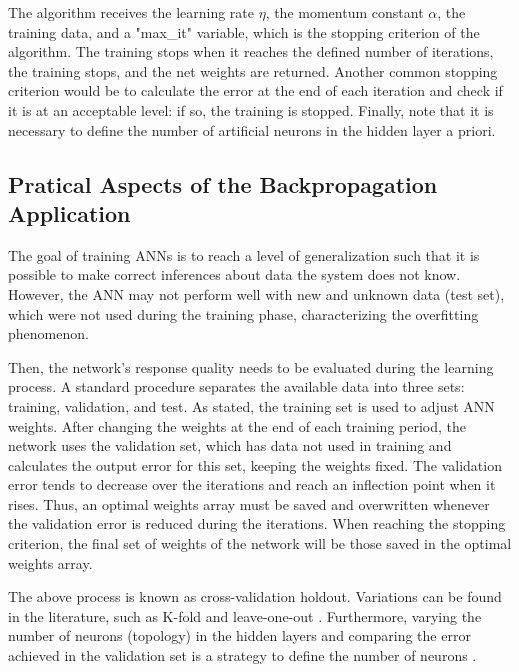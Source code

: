 
The algorithm receives the learning rate $\eta$, the momentum constant $\alpha$, the training data, and a "max\_it" variable, which is the stopping criterion of the algorithm. The training stops when it reaches the defined number of iterations, the training stops, and the net weights are returned. Another common stopping criterion would be to calculate the error at the end of each iteration and check if it is at an acceptable level: if so, the training is stopped. Finally, note that it is necessary to define the number of artificial neurons in the hidden layer a priori.

\subsection{Pratical Aspects of the Backpropagation Application}
\label{ssec:Pratical}

The goal of training ANNs is to reach a level of generalization such that it is possible to make correct inferences about data the system does not know. However, the ANN may not perform well with new and unknown data (test set), which were not used during the training phase, characterizing the overfitting phenomenon.

Then, the network's response quality needs to be evaluated during the learning process. A standard procedure separates the available data into three sets: training, validation, and test. As stated, the training set is used to adjust ANN weights. After changing the weights at the end of each training period, the network uses the validation set, which has data not used in training and calculates the output error for this set, keeping the weights fixed. The validation error tends to decrease over the iterations and reach an inflection point when it rises. Thus, an optimal weights array must be saved and overwritten whenever the validation error is reduced during the iterations. When reaching the stopping criterion, the final set of weights of the network will be those saved in the optimal weights array.

The above process is known as cross-validation holdout. Variations can be found in the literature, such as K-fold and leave-one-out \cite{haykin, Castro2006FundamentalsON}. Furthermore, varying the number of neurons (topology) in the hidden layers and comparing the error achieved in the validation set is a strategy to define the number of neurons \cite{James2013}.

